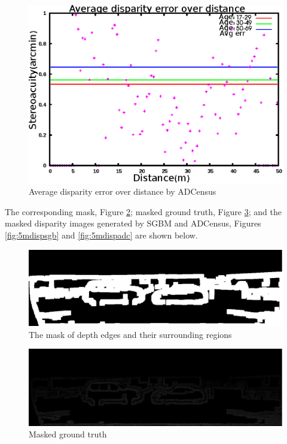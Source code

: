 \begin{figure}[H]
\centering
\includegraphics[scale=0.8]{adcimg5pix3msk}
\caption{Average disparity error over distance by ADCensus}
\label{fig:imgfull5}
\end{figure}

\noindent
The corresponding mask, Figure \ref{fig:msk}; masked ground truth, Figure \ref{fig:gtmsk}; and
the masked disparity images generated by SGBM and ADCensus, Figures \ref{fig:5mdispsgb} and \ref{fig:5mdispadc} 
are shown below.

\begin{figure}[H]
\centering
\includegraphics[scale=0.35]{5msk}
\caption{The mask of depth edges and their surrounding regions}
\label{fig:msk}
\end{figure} 

\begin{figure}[H]
\centering
\includegraphics[scale=0.35]{5gt}
\caption{Masked ground truth}
\label{fig:gtmsk}
\end{figure} 

